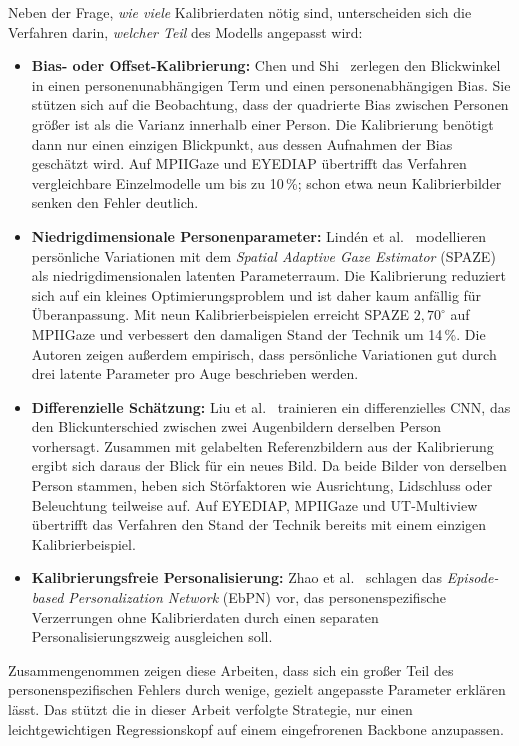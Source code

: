 \documentclass[
  11pt,
  a4paper,
  oneside,
  DIV=12,                 %
  BCOR=8mm,               %
  parskip=half,           %
  headings=normal,
  bibliography=totoc,     %
  listof=totoc            %
]{scrreprt}
\begin{document}
Neben der Frage, \emph{wie viele} Kalibrierdaten nötig sind, unterscheiden sich die Verfahren darin, \emph{welcher Teil} des Modells angepasst wird:
\begin{itemize}
  \item \textbf{Bias- oder Offset-Kalibrierung:} Chen und Shi~\cite{chen2020offset} zerlegen den Blickwinkel in einen personenunabhängigen Term und einen personenabhängigen Bias. Sie stützen sich auf die Beobachtung, dass der quadrierte Bias zwischen Personen größer ist als die Varianz innerhalb einer Person. Die Kalibrierung benötigt dann nur einen einzigen Blickpunkt, aus dessen Aufnahmen der Bias geschätzt wird. Auf MPIIGaze und EYEDIAP übertrifft das Verfahren vergleichbare Einzelmodelle um bis zu 10\,\%; schon etwa neun Kalibrierbilder senken den Fehler deutlich.
  \item \textbf{Niedrigdimensionale Personenparameter:} Lindén et al.~\cite{linden2019spaze} modellieren persönliche Variationen mit dem \emph{Spatial Adaptive Gaze Estimator} (SPAZE) als niedrigdimensionalen latenten Parameterraum. Die Kalibrierung reduziert sich auf ein kleines Optimierungsproblem und ist daher kaum anfällig für Überanpassung. Mit neun Kalibrierbeispielen erreicht SPAZE $2,70^\circ$ auf MPIIGaze und verbessert den damaligen Stand der Technik um 14\,\%. Die Autoren zeigen außerdem empirisch, dass persönliche Variationen gut durch drei latente Parameter pro Auge beschrieben werden.
  \item \textbf{Differenzielle Schätzung:} Liu et al.~\cite{liu2021differential} trainieren ein differenzielles CNN, das den Blickunterschied zwischen zwei Augenbildern derselben Person vorhersagt. Zusammen mit gelabelten Referenzbildern aus der Kalibrierung ergibt sich daraus der Blick für ein neues Bild. Da beide Bilder von derselben Person stammen, heben sich Störfaktoren wie Ausrichtung, Lidschluss oder Beleuchtung teilweise auf. Auf EYEDIAP, MPIIGaze und UT-Multiview übertrifft das Verfahren den Stand der Technik bereits mit einem einzigen Kalibrierbeispiel.
  \item \textbf{Kalibrierungsfreie Personalisierung:} Zhao et al.~\cite{zhao2022ebpn} schlagen das \emph{Episode-based Personalization Network} (EbPN) vor, das personenspezifische Verzerrungen ohne Kalibrierdaten durch einen separaten Personalisierungszweig ausgleichen soll.
\end{itemize}
Zusammengenommen zeigen diese Arbeiten, dass sich ein großer Teil des personenspezifischen Fehlers durch wenige, gezielt angepasste Parameter erklären lässt. Das stützt die in dieser Arbeit verfolgte Strategie, nur einen leichtgewichtigen Regressionskopf auf einem eingefrorenen Backbone anzupassen.
\end{document}
